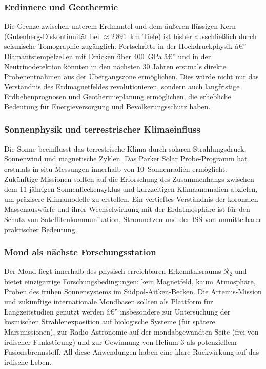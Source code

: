 ﻿\documentclass[a4paper,12pt]{article}
\theoremstyle{definition}
\begin{document}
\subsubsection{Erdinnere und Geothermie}

Die Grenze zwischen unterem Erdmantel und dem äußeren flüssigen Kern
(Gutenberg-Diskontinuität bei $\approx 2\,891$~km Tiefe) ist bisher
ausschließlich durch seismische Tomographie zugänglich. Fortschritte in der
Hochdruckphysik â€” Diamantstempelzellen mit Drücken über 400~GPa â€” und in der
Neutrinodetektion könnten in den nächsten 30 Jahren erstmals direkte
Probenentnahmen aus der Übergangszone ermöglichen. Dies würde nicht nur das
Verständnis des Erdmagnetfeldes revolutionieren, sondern auch langfristige
Erdbebenprognosen und Geothermieplanung ermöglichen, die erhebliche Bedeutung
für Energieversorgung und Bevölkerungsschutz haben.

\subsubsection{Sonnenphysik und terrestrischer Klimaeinfluss}

Die Sonne beeinflusst das terrestrische Klima durch solaren Strahlungsdruck,
Sonnenwind und magnetische Zyklen. Das Parker Solar Probe-Programm hat
erstmals in-situ Messungen innerhalb von 10~Sonnenradien ermöglicht.
Zukünftige Missionen sollten auf die Erforschung des Zusammenhangs zwischen
dem 11-jährigen Sonnenfleckenzyklus und kurzzeitigen Klimaanomalien abzielen,
um präzisere Klimamodelle zu erstellen. Ein vertieftes Verständnis der
koronalen Massenauswürfe und ihrer Wechselwirkung mit der Erdatmosphäre ist
für den Schutz von Satellitenkommunikation, Stromnetzen und der ISS von
unmittelbarer praktischer Bedeutung.

\subsubsection{Mond als nächste Forschungsstation}

Der Mond liegt innerhalb des physisch erreichbaren Erkenntnisraums
$\mathcal{R}_2$ und bietet einzigartige Forschungsbedingungen: kein Magnetfeld,
kaum Atmosphäre, Proben des frühen Sonnensystems im Südpol-Aitken-Becken.
Die Artemis-Mission und zukünftige internationale Mondbasen sollten als
Plattform für Langzeitstudien genutzt werden â€” insbesondere zur Untersuchung
der kosmischen Strahlenexposition auf biologische Systeme (für spätere
Marsmissionen), zur Radio-Astronomie auf der mondabgewandten Seite (frei von
irdischer Funkstörung) und zur Gewinnung von Helium-3 als potenziellem
Fusionsbrennstoff. All diese Anwendungen haben eine klare Rückwirkung auf das
irdische Leben.
\end{document}
